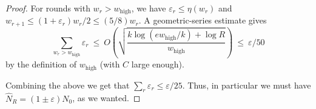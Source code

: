 \documentclass[10pt,a4paper]{amsart}
\DeclareMathOperator{\high}{\mathrm{high}}
\newcommand{\ignore}[1]{{}}
\renewcommand{\epsilon}{\varepsilon}
\begin{document}
\begin{proof}
For rounds with $w_r>w_{\high}$, we have $\epsilon_r\le \eta(w_r)$ and 
$w_{r+1}\le (1+\epsilon_r)w_r/2\le (5/8)w_r$. A geometric-series estimate gives
\[
\sum_{w_r>w_{\high}}\epsilon_r
\ \le\
O\!\left(\sqrt{\frac{k\log(e w_{\high}/k)+\log R}{w_{\high}}}\right)
\ \le\ \varepsilon/50
\]
by the definition of $w_{\high}$ (with $C$ large enough).

Combining the above we get that $\sum_r \epsilon_r \leq \varepsilon/25$. Thus, in particular we must have 
$\widehat{N}_R = (1 \pm \varepsilon) N_0$, as we wanted.

\ignore{
Let $W_r:=|S\cap U_r|$ be the true residual weight at round $r$.  
Define the estimator recursively:
\[
\widehat W_R:=|S\cap U_R|,
\qquad
\widehat W_r:=|S\cap I_r|+2\widehat W_{r+1}\quad (r=R-1,\dots,0).
\]
Then $\widehat W_0=\widehat{\mathrm{wt}}_{T,\alpha}(x)$.

Let $R_r:=S\cap V_r$, so $W_r=|S\cap I_r|+|R_r|$ and $W_{r+1}=|R_r\cap U_{r+1}|$.
If $W_r\le w_{\min}$ then $S\cap U_r\subseteq I_{r,\mathrm{tiny}}\subseteq I_r$, so $R_r=\emptyset$
and $W_{r+1}=0$ and $\widehat W_r=W_r$ exactly.

Otherwise, let dyadic $w$ satisfy $W_r\in(w,2w]$.
If $w\le w_{\high}$ then by the medium-regime guarantee we have
\[
\big|\,2W_{r+1}-|R_r|\,\big|\ \le\ \eta_0 w\ \le\ \eta_0 W_r.
\]
If $w>w_{\high}$ then by the large-regime guarantee we have
\[
\big|\,2W_{r+1}-|R_r|\,\big|\ \le\ \eta(w)\,w\ \le\ \eta(w)\,W_r.
\]
In either case we obtain
\begin{equation}\label{eq:eta_r_def_v2}
\big|\,2W_{r+1}-|R_r|\,\big|\ \le\ \eta_r\,W_r,
\qquad\text{where}\qquad
\eta_r:=\begin{cases}
0 & W_r\le w_{\min},\\
\eta_0 & w_{\min}<W_r\le w_{\high},\\
\eta(w) & W_r>w_{\high}.
\end{cases}
\end{equation}

\paragraph{Error propagation.}
Define $\xi_R:=0$ and for $r=R-1,\dots,0$ set
\[
\xi_r\ :=\ \eta_r+(1+\eta_r)\xi_{r+1}.
\]
We claim that for all $r$,
\begin{equation}\label{eq:xi_claim_v2}
(1-\xi_r)W_r\ \le\ \widehat W_r\ \le\ (1+\xi_r)W_r.
\end{equation}
We prove this by backward induction on $r$.
The base case $r=R$ holds since $\widehat W_R=W_R$ and $\xi_R=0$.

}
\end{proof}
\end{document}
